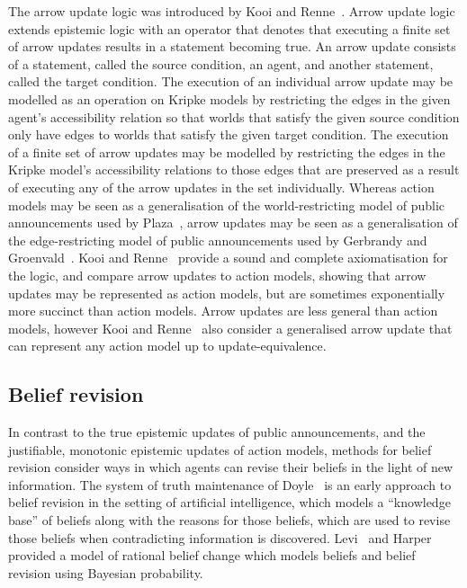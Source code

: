 The arrow update logic was introduced by Kooi and Renne~\cite{kooi:2011a}.
Arrow update logic extends epistemic logic with an operator that denotes that executing a finite set of arrow updates results in a statement becoming true.
An arrow update consists of a statement, called the source condition, an agent, and another statement, called the target condition.
The execution of an individual arrow update may be modelled as an operation on Kripke models by restricting the edges in the given agent's accessibility relation so that worlds that satisfy the given source condition only have edges to worlds that satisfy the given target condition.
The execution of a finite set of arrow updates may be modelled by restricting the edges in the Kripke model's accessibility relations to those edges that are preserved as a result of executing any of the arrow updates in the set individually.
Whereas action models may be seen as a generalisation of the world-restricting model of public announcements used by Plaza~\cite{plaza:1989}, arrow updates may be seen as a generalisation of the edge-restricting model of public announcements used by Gerbrandy and Groenvald~\cite{gerbrandy:1997}.
Kooi and Renne~\cite{kooi:2011a} provide a sound and complete axiomatisation for the logic, and compare arrow updates to action models, showing that arrow updates may be represented as action models, but are sometimes exponentially more succinct than action models.
Arrow updates are less general than action models, however Kooi and Renne~\cite{kooi:2011b} also consider a generalised arrow update that can represent any action model up to update-equivalence.

\subsection{Belief revision}

In contrast to the true epistemic updates of public announcements, and the justifiable, monotonic epistemic updates of action models, methods for belief revision consider ways in which agents can revise their beliefs in the light of new information.
The system of truth maintenance of Doyle~\cite{doyle:1979} is an early approach to belief revision in the setting of artificial intelligence, which models a ``knowledge base'' of beliefs along with the reasons for those beliefs, which are used to revise those beliefs when contradicting information is discovered. 
Levi~\cite{levi:1983} and Harper~\cite{harper:1976} provided a model of rational belief change which models beliefs and belief revision using Bayesian probability.

